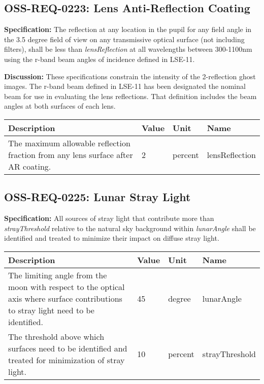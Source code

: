 \documentclass[SE,authoryear,toc]{lsstdoc}
\begin{document}
\subsection{OSS-REQ-0223: Lens Anti-Reflection Coating} 
 \label{sec:arcoating}

\textbf{Specification:} The reflection at any location in the pupil for any field angle in the 3.5 degree field of view on any transmissive optical surface (not including filters), shall be less than \textit{lensReflection} at all wavelengths between 300-1100nm using the r-band beam angles of incidence defined in LSE-11.

\textbf{Discussion:} These specifications constrain the intensity of the 2-reflection ghost images. The r-band beam defined in LSE-11 has been designated the nominal beam for use in evaluating the lens reflections. That definition includes the beam angles at both surfaces of each lens.

\begin{center}
\begin{tabular}{p{}p{}p{}p{}}\hline
    \textbf{Description} & \textbf{Value} & \textbf{Unit} & \textbf{Name} \\\hline
    The maximum allowable reflection fraction from any lens surface after AR coating. & 2 & percent & lensReflection \\\hline
\end{tabular}
\end{center}

\subsection{OSS-REQ-0225: Lunar Stray Light}  \label{sec:lunar}

\textbf{Specification:} All sources of stray light that contribute more than \textit{strayThreshold} relative to the natural sky background within \textit{lunarAngle} shall be identified and treated to minimize their impact on diffuse stray light.

\begin{center}
\begin{tabular}{p{}p{}p{}p{}}\hline
    \textbf{Description} & \textbf{Value} & \textbf{Unit} & \textbf{Name} \\\hline
    The limiting angle from the moon with respect to the optical axis where surface contributions to stray light need to be identified. & 45 & degree & lunarAngle \\\hline
    The threshold above which surfaces need to be identified and treated for minimization of stray light. & 10 & percent & strayThreshold \\\hline
\end{tabular}
\end{center}
\end{document}

